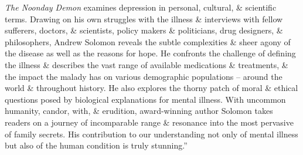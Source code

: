 \documentclass{article}
\begin{document}
\begin{enumerate}
	{\it The Noonday Demon} examines depression in personal, cultural, \& scientific terms. Drawing on his own struggles with the illness \& interviews with fellow sufferers, doctors, \& scientists, policy makers \& politicians, drug designers, \& philosophers, {\sc Andrew Solomon} reveals the subtle complexities \& sheer agony of the disease as well as the reasons for hope. He confronts the challenge of defining the illness \& describes the vast range of available medications \& treatments, \& the impact the malady has on various demographic populations -- around the world \& throughout history. He also explores the thorny patch of moral \& ethical questions posed by biological explanations for mental illness. With uncommon humanity, candor, with, \& erudition, award-winning author {\sc Solomon} takes readers on a journey of incomparable range \& resonance into the most pervasive of family secrets. His contribution to our understanding not only of mental illness but also of the human condition is truly stunning.''


\end{enumerate}
\end{document}

